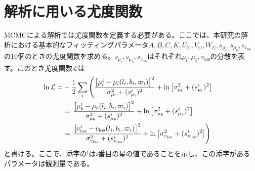 
\section{解析に用いる尤度関数}
MCMCによる解析では尤度関数を定義する必要がある。ここでは、本研究の解析における基本的なフィッティングパラメータ$A,B,C,K,U_{\odot},V_{\odot},W_{\odot},s_{\mu_l},s_{\mu_b},s_{v_{\mathrm{los}}}$の10個のときの尤度関数を求める。$s_{\mu_l},s_{\mu_b},s_{v_{\mathrm{los}}}$はそれぞれ$\mu_l,\mu_b,v_{\mathrm{los}}$の分散を表す。このとき尤度関数$\mathcal{L}$は
\begin{align}
\begin{aligned}
	\ln \mathcal{L} =& -\frac{1}{2}\sum_i \left(\frac{\left[\mu_l^i - \mu_l(l_i,b_i,\varpi_i)\right]^2}{\sigma_{\mu_l}^2 + (s_{\mu_l}^i)^2}  + {\rm ln}\left[\sigma_{\mu_l}^2 + (s_{\mu_l}^i)^2\right] \right. \\
	& = \left. \frac{\left[\mu_b^i - \mu_b(l_i,b_i,\varpi_i)\right]^2}{\sigma_{\mu_b}^2 + (s_{\mu_b}^i)^2}  + {\rm ln}\left[\sigma_{\mu_b}^2 + (s_{\mu_b}^i)^2\right] \right. \\
	&= \left. \frac{\left[v_{\mathrm{los}}^i - v_{\mathrm{los}}(l_i,b_i,\varpi_i)\right]^2}{\sigma_{v_{\mathrm{los}}}^2 + (s_{v_{\mathrm{los}}}^i)^2} + {\rm ln}\left[\sigma_{v_{\mathrm{los}}}^2 + (s_{v_{\mathrm{los}}}^i)^2\right] \right)
\end{aligned}
\end{align}
と書ける。ここで、添字の$^i$は$i$番目の星の値であることを示し、この添字があるパラメータは観測量である。


